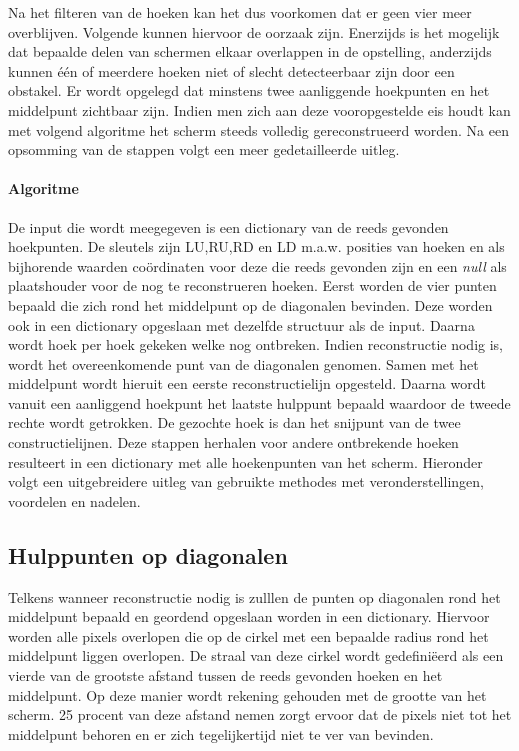 
	Na het filteren van de hoeken kan het dus voorkomen dat er geen vier meer overblijven. Volgende kunnen hiervoor de oorzaak zijn. Enerzijds is het mogelijk dat bepaalde delen van schermen elkaar overlappen in de opstelling, anderzijds kunnen één of meerdere hoeken niet of slecht detecteerbaar zijn door een obstakel. Er wordt opgelegd dat minstens twee aanliggende hoekpunten en het middelpunt zichtbaar zijn. Indien men zich aan deze vooropgestelde eis houdt kan met volgend algoritme het scherm steeds volledig gereconstrueerd worden. Na een opsomming van de stappen volgt een meer gedetailleerde uitleg.
	\paragraph{Algoritme}
	 De input die wordt meegegeven is een dictionary van de reeds gevonden hoekpunten. De sleutels zijn LU,RU,RD en LD m.a.w. posities van hoeken en als bijhorende waarden coördinaten voor deze die reeds gevonden zijn en een \textit{null} als plaatshouder voor de nog te reconstrueren hoeken. \newline
	 Eerst worden de vier punten bepaald die zich rond het middelpunt op de diagonalen bevinden. Deze worden ook in een dictionary opgeslaan met dezelfde structuur als de input. Daarna wordt hoek per hoek gekeken welke nog ontbreken. Indien reconstructie nodig is, wordt het overeenkomende punt van de diagonalen genomen. Samen met het middelpunt wordt hieruit een eerste reconstructielijn opgesteld. Daarna wordt vanuit een aanliggend hoekpunt het laatste hulppunt bepaald waardoor de tweede rechte wordt getrokken. De gezochte hoek is dan het snijpunt van de twee constructielijnen. Deze stappen herhalen voor andere ontbrekende hoeken resulteert in een dictionary met alle hoekenpunten van het scherm. Hieronder volgt een uitgebreidere uitleg van gebruikte methodes met veronderstellingen, voordelen en nadelen.
	
	\subsection{Hulppunten op diagonalen} \label{subsec:diagonalen}
		
		Telkens wanneer reconstructie nodig is zulllen de punten op diagonalen rond het middelpunt bepaald en geordend opgeslaan worden in een dictionary. Hiervoor worden alle pixels overlopen die op de cirkel met een bepaalde radius rond het middelpunt liggen overlopen. De straal van deze cirkel wordt gedefiniëerd als een vierde van de grootste afstand tussen de reeds gevonden hoeken en het middelpunt. Op deze manier wordt rekening gehouden met de grootte van het scherm. 25 procent van deze afstand nemen zorgt ervoor dat de pixels niet tot het middelpunt behoren en er zich tegelijkertijd niet te ver van bevinden. 

